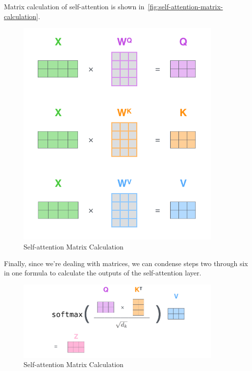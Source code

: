 Matrix calculation of self-attention is shown in~\autoref{fig:self-attention-matrix-calculation}.

\begin{figure}
	\begin{center}
		\includegraphics[width=0.9\textwidth]{figures/self-attention-matrix-calculation}
	\end{center}
	\caption{Self-attention Matrix Calculation}\label{fig:self-attention-matrix-calculation}
\end{figure}

Finally, since we’re dealing with matrices, we can condense steps two through six in one formula to calculate the outputs of the self-attention layer.

\begin{figure}
	\begin{center}
		\includegraphics[width=0.9\textwidth]{figures/self-attention-matrix-calculation-2}
	\end{center}
	\caption{Self-attention Matrix Calculation}\label{fig:self-attention-matrix-calculation-2}
\end{figure}

